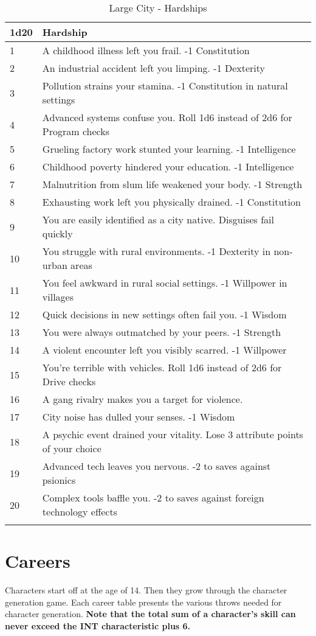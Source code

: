 \documentclass[itdr/core]{subfiles}
\begin{document}
\begin{longtable}{p{}p{}}
\hline
\textbf{1d20} & \textbf{Hardship} \\
\hline
1 & A childhood illness left you frail. -1 Constitution \\
2 & An industrial accident left you limping. -1 Dexterity \\
3 & Pollution strains your stamina. -1 Constitution in natural settings \\
4 & Advanced systems confuse you. Roll 1d6 instead of 2d6 for Program checks \\
5 & Grueling factory work stunted your learning. -1 Intelligence \\
6 & Childhood poverty hindered your education. -1 Intelligence \\
7 & Malnutrition from slum life weakened your body. -1 Strength \\
8 & Exhausting work left you physically drained. -1 Constitution \\
9 & You are easily identified as a city native. Disguises fail quickly \\
10 & You struggle with rural environments. -1 Dexterity in non-urban areas \\
11 & You feel awkward in rural social settings. -1 Willpower in villages \\
12 & Quick decisions in new settings often fail you. -1 Wisdom \\
13 & You were always outmatched by your peers. -1 Strength \\
14 & A violent encounter left you visibly scarred. -1 Willpower \\
15 & You're terrible with vehicles. Roll 1d6 instead of 2d6 for Drive checks \\
16 & A gang rivalry makes you a target for violence. \\
17 & City noise has dulled your senses. -1 Wisdom \\
18 & A psychic event drained your vitality. Lose 3 attribute points of your choice \\
19 & Advanced tech leaves you nervous. -2 to saves against psionics \\
20 & Complex tools baffle you. -2 to saves against foreign technology effects \\
\hline
\caption{Large City - Hardships}
\label{table:large-city-hardships}
\end{longtable}


\section{Careers} %
\label{sec:careers}
Characters start off at the age of 14. Then they grow through the character generation game. Each career table presents
the various throws needed for character generation. \textbf{Note that the total sum of a character's skill can never
exceed the INT characteristic plus 6.}
\end{document}
